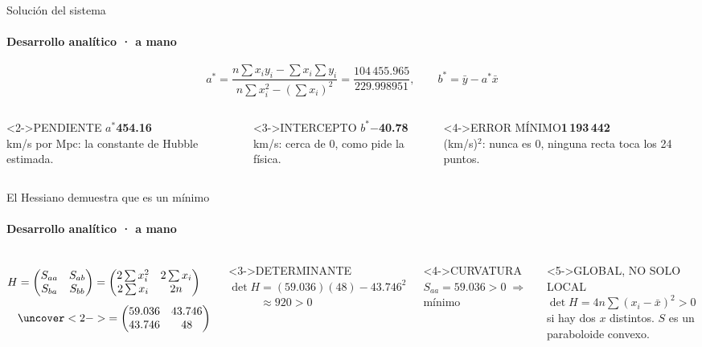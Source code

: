 \documentclass[aspectratio=169,11pt]{beamer}
\newcommand{\tarjeta}[3][]{%
  \begin{block}#1{\MakeUppercase{#2}}\small #3\end{block}}
\newcommand{\grande}[1]{{\fontsize{30}{32}\selectfont\bfseries\color{tinta}#1}}
\begin{document}
\begin{frame}{Solución del sistema}
  \framesubtitle{Desarrollo analítico · a mano}
  \[
    a^* = \frac{n\sum x_i y_i - \sum x_i \sum y_i}{n\sum x_i^2 - \left(\sum x_i\right)^2} = \frac{104\,455.965}{229.998951},
    \qquad b^* = \bar y - a^*\bar x
  \]
  \vfill
  \begin{columns}[T]
    \tarjeta[<2->]{Pendiente $a^*$}{\grande{454.16}\\[0.3em]km/s por Mpc: la constante de Hubble estimada.}
    \tarjeta[<3->]{Intercepto $b^*$}{\grande{$-$40.78}\\[0.3em]km/s: cerca de 0, como pide la física.}
    \tarjeta[<4->]{Error mínimo}{\grande{1\,193\,442}\\[0.3em](km/s)$^2$: nunca es 0, ninguna recta toca los 24 puntos.}
  \end{columns}
\end{frame}

\begin{frame}{El Hessiano demuestra que es un mínimo}
  \framesubtitle{Desarrollo analítico · a mano}
  \begin{columns}[c]
      \begin{align*}
        H &= \begin{pmatrix} S_{aa} & S_{ab} \\ S_{ba} & S_{bb} \end{pmatrix}
           = \begin{pmatrix} 2\sum x_i^2 & 2\sum x_i \\ 2\sum x_i & 2n \end{pmatrix} \\[0.4em]
          &\uncover<2->{= \begin{pmatrix} 59.036 & 43.746 \\ 43.746 & 48 \end{pmatrix}}
      \end{align*}
      \tarjeta[<3->]{Determinante}{$\det H = (59.036)(48) - 43.746^2$\\$\phantom{\det H}\approx 920 > 0$}
      \tarjeta[<4->]{Curvatura}{$S_{aa} = 59.036 > 0 \;\Rightarrow\;$ mínimo}
      \tarjeta[<5->]{Global, no solo local}{$\det H = 4n\sum (x_i - \bar x)^2 > 0$ si hay dos $x$ distintos. $S$ es un paraboloide convexo.}
  \end{columns}
\end{frame}
\end{document}
